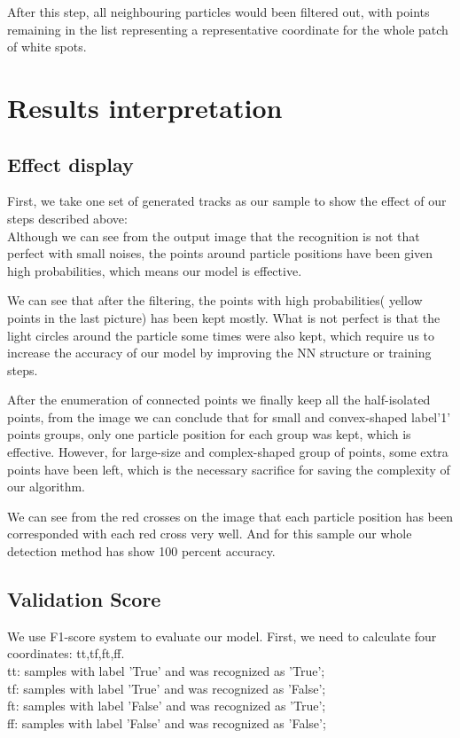 \documentclass[11pt,a4paper]{scrartcl}
\begin{document}
After this step, all neighbouring particles would been filtered out, with points remaining in the list representing a representative coordinate for the whole patch of white spots.


\section{Results interpretation}

\subsection{Effect display} %

First, we take one set of generated tracks as our sample to show the effect of our steps described above: \\


Although we can see from the output image that the recognition is not that perfect with small noises, the points around particle positions have been given high probabilities, which means our model is effective.



We can see that after the filtering, the points with high probabilities( yellow points in the last picture) has been kept mostly. What is not perfect is that the light circles around the particle some times were also kept, which require us to increase the accuracy of our model by improving the NN structure or training steps.

After the enumeration of connected points we finally keep all the half-isolated points, from the image we can conclude that for small and convex-shaped label'1' points groups, only one particle position for each group was kept, which is effective. However, for large-size and complex-shaped group of points, some extra points have been left, which is the necessary sacrifice for saving the complexity of our algorithm.

We can see from the red crosses on the image that each particle position has been corresponded with each red cross very well. And for this sample our whole detection method has show 100 percent accuracy.



\subsection{Validation Score}
We use F1-score system to evaluate our model. First, we need to calculate four coordinates: tt,tf,ft,ff.\\
tt: samples with label 'True' and was recognized as 'True';\\
tf: samples with label 'True' and was recognized as 'False';\\
ft: samples with label 'False' and was recognized as 'True';\\
ff: samples with label 'False' and was recognized as 'False';\\
\end{document}
